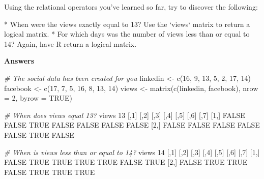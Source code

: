 \documentclass[]{article}
\newcommand{\hlnum}[1]{\textcolor[rgb]{0.816,0.125,0.439}{#1}}%
\newcommand{\hlstr}[1]{\textcolor[rgb]{0.251,0.627,0.251}{#1}}%
\newcommand{\hlcom}[1]{\textcolor[rgb]{0.502,0.502,0.502}{\textit{#1}}}%
\newcommand{\hlstd}[1]{\textcolor[rgb]{0.251,0.251,0.251}{#1}}%
\newcommand{\hlkwc}[1]{\textcolor[rgb]{0.251,0.251,0.251}{#1}}%
\newcommand{\hlkwd}[1]{\textcolor[rgb]{0.878,0.439,0.125}{#1}}%
\newenvironment{Shaded}{\begin{myshaded}}{\end{myshaded}}
\newcommand{\KeywordTok}[1]{\hlkwd{#1}}
\newcommand{\DataTypeTok}[1]{\hlkwc{#1}}
\newcommand{\DecValTok}[1]{\hlnum{#1}}
\newcommand{\StringTok}[1]{\hlstr{#1}}
\newcommand{\CommentTok}[1]{\hlcom{#1}}
\newcommand{\OtherTok}[1]{{#1}}
\newcommand{\NormalTok}[1]{\hlstd{#1}}
\begin{document}
\begin{Shaded}
\begin{Highlighting}[]
\NormalTok{Using the relational operators you}\StringTok{'ve learned so far, try to discover the following:}

\StringTok{* When were the views exactly equal to 13? Use the `views` matrix to return a logical matrix.}
\StringTok{* For which days was the number of views less than or equal to 14? Again, have R return a logical matrix.}
\end{Highlighting}
\end{Shaded}

\textbf{Answers}

\begin{Shaded}
\begin{Highlighting}[]
\CommentTok{# The social data has been created for you}
\NormalTok{linkedin <-}\StringTok{ }\KeywordTok{c}\NormalTok{(}\DecValTok{16}\NormalTok{, }\DecValTok{9}\NormalTok{, }\DecValTok{13}\NormalTok{, }\DecValTok{5}\NormalTok{, }\DecValTok{2}\NormalTok{, }\DecValTok{17}\NormalTok{, }\DecValTok{14}\NormalTok{)}
\NormalTok{facebook <-}\StringTok{ }\KeywordTok{c}\NormalTok{(}\DecValTok{17}\NormalTok{, }\DecValTok{7}\NormalTok{, }\DecValTok{5}\NormalTok{, }\DecValTok{16}\NormalTok{, }\DecValTok{8}\NormalTok{, }\DecValTok{13}\NormalTok{, }\DecValTok{14}\NormalTok{)}
\NormalTok{views <-}\StringTok{ }\KeywordTok{matrix}\NormalTok{(}\KeywordTok{c}\NormalTok{(linkedin, facebook), }\DataTypeTok{nrow =} \DecValTok{2}\NormalTok{, }\DataTypeTok{byrow =} \OtherTok{TRUE}\NormalTok{)}

\CommentTok{# When does views equal 13?}
\NormalTok{views }\OperatorTok{==}\StringTok{ }\DecValTok{13}
\NormalTok{         [,}\DecValTok{1}\NormalTok{]  [,}\DecValTok{2}\NormalTok{]  [,}\DecValTok{3}\NormalTok{]  [,}\DecValTok{4}\NormalTok{]  [,}\DecValTok{5}\NormalTok{]  [,}\DecValTok{6}\NormalTok{]  [,}\DecValTok{7}\NormalTok{]}
\NormalTok{   [}\DecValTok{1}\NormalTok{,] }\OtherTok{FALSE} \OtherTok{FALSE}  \OtherTok{TRUE} \OtherTok{FALSE} \OtherTok{FALSE} \OtherTok{FALSE} \OtherTok{FALSE}
\NormalTok{   [}\DecValTok{2}\NormalTok{,] }\OtherTok{FALSE} \OtherTok{FALSE} \OtherTok{FALSE} \OtherTok{FALSE} \OtherTok{FALSE}  \OtherTok{TRUE} \OtherTok{FALSE}

\CommentTok{# When is views less than or equal to 14?}
\NormalTok{views }\OperatorTok{<=}\StringTok{ }\DecValTok{14}
\NormalTok{         [,}\DecValTok{1}\NormalTok{] [,}\DecValTok{2}\NormalTok{] [,}\DecValTok{3}\NormalTok{]  [,}\DecValTok{4}\NormalTok{] [,}\DecValTok{5}\NormalTok{]  [,}\DecValTok{6}\NormalTok{] [,}\DecValTok{7}\NormalTok{]}
\NormalTok{   [}\DecValTok{1}\NormalTok{,] }\OtherTok{FALSE} \OtherTok{TRUE} \OtherTok{TRUE}  \OtherTok{TRUE} \OtherTok{TRUE} \OtherTok{FALSE} \OtherTok{TRUE}
\NormalTok{   [}\DecValTok{2}\NormalTok{,] }\OtherTok{FALSE} \OtherTok{TRUE} \OtherTok{TRUE} \OtherTok{FALSE} \OtherTok{TRUE}  \OtherTok{TRUE} \OtherTok{TRUE}
\end{Highlighting}
\end{Shaded}
\end{document}
